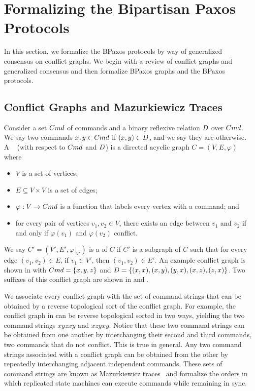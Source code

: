 \section{Formalizing the Bipartisan Paxos Protocols}%

In this section, we formalize the BPaxos protocols by way of generalized
consensus on conflict graphs. We begin with a review of conflict graphs and
generalized consensus and then formalize BPaxos graphs and the BPaxos
protocols.

\subsection{Conflict Graphs and Mazurkiewicz Traces}%

Consider a set $Cmd$ of commands and a binary reflexive relation $D$
over $Cmd$. We say two commands $x, y \in Cmd$  if $(x, y)
\in D$, and we say they are  otherwise. A
~\cite{mazurkiewicz1995introduction} (with respect to
$Cmd$ and $D$) is a directed acyclic graph $C = (V, E, \varphi)$ where
\begin{itemize}
  \item
    $V$ is a set of vertices;
  \item
    $E \subseteq V \times V$ is a set of edges;
  \item
    $\varphi: V \to Cmd$ is a function that labels every vertex with a command;
    and
  \item
    for every pair of vertices $v_1, v_2 \in V$, there exists an edge between
    $v_1$ and $v_2$ if and only if $\varphi(v_1)$ and $\varphi(v_2)$ conflict.
\end{itemize}

We say $C' = (V', E', \varphi|_{V'})$ is a  of $C$ if $C'$ is a
subgraph of $C$ such that for every edge $(v_1, v_2) \in E$, if $v_1 \in V'$,
then $(v_1, v_2) \in E'$.
%
An example conflict graph is shown in  with $Cmd
= \{x, y, z\}$ and $D = \{(x, x), (x, y), (y, x), (x, z), (z,
x)\}$. Two suffixes of this conflict graph are shown in 
and .



We associate every conflict graph with the set of command strings that can be
obtained by a reverse topological sort of the conflict graph. For example, the
conflict graph in  can be reverse topological
sorted in two ways, yielding the two command strings $xyzxy$ and $xzyxy$.
Notice that these two command strings can be obtained from one another by
interchanging their second and third commands, two commands that do not
conflict. This is true in general. Any two command strings associated with a
conflict graph can be obtained from the other by repeatedly interchanging
adjacent independent commands. These sets of command strings are known as
Mazurkiewicz traces~\cite{mazurkiewicz1985semantics,
mazurkiewicz1995introduction} and formalize the orders in which replicated
state machines can execute commands while remaining in sync.


